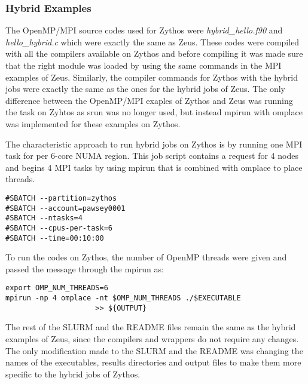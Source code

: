 \subsubsection{Hybrid Examples}

The OpenMP/MPI source codes used for Zythos were \emph{hybrid\_hello.f90} and \emph{hello\_hybrid.c} which were exactly the same as Zeus. These codes 
were compiled with all the compilers available on Zythos and before compiling it was made sure that the right module was loaded by using the same 
commands in the MPI examples of Zeus. Similarly, the compiler commands for Zythos with the hybrid jobs were exactly the same as the ones for the hybrid 
jobs of Zeus. The only difference between the OpenMP/MPI exaples of Zythos and Zeus was running the task on Zyhtos as srun was no longer used, but 
instead mpirun with omplace was implemented for these examples on Zythos. 

The characteristic approach to run hybrid jobs on Zythos is by running one MPI task for per 6-core NUMA region. This job script contains a request for 4
nodes and begins 4 MPI tasks by using mpirun that is combined with omplace to place threads.

\begin{tcolorbox}
\begin{Verbatim}[fontsize=\scriptsize]
#SBATCH --partition=zythos
#SBATCH --account=pawsey0001
#SBATCH --ntasks=4
#SBATCH --cpus-per-task=6
#SBATCH --time=00:10:00
\end{Verbatim}
\end{tcolorbox}

To run the codes on Zythos, the number of OpenMP threads were given and passed the message through the mpirun as:

\begin{tcolorbox}
\begin{Verbatim}[fontsize=\scriptsize]
export OMP_NUM_THREADS=6
mpirun -np 4 omplace -nt $OMP_NUM_THREADS ./$EXECUTABLE
					 >> ${OUTPUT}
\end{Verbatim}
\end{tcolorbox}

The rest of the SLURM and the README files remain the same as the hybrid examples of Zeus, since the compilers and wrappers do not require any changes.
The only modification made to the SLURM and the README was changing the names of the executables, results directories and output files to make them more
specific to the hybrid jobs of Zythos.

